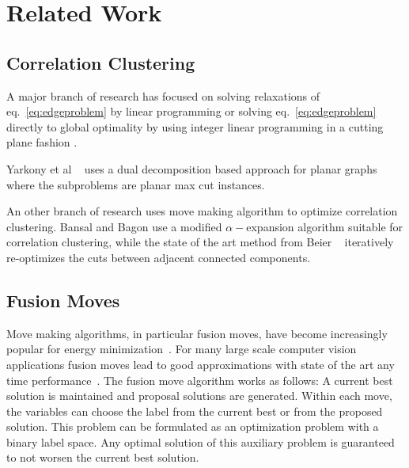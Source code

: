 \documentclass[10pt,twocolumn,letterpaper]{article}
\begin{document}
\section{Related Work}\label{sec:related_work}

\subsection{Correlation Clustering}\label{sec:cc}
A major branch of research has focused on solving 
relaxations of eq.~\ref{eq:edgeproblem} by linear programming
or solving  eq.~\ref{eq:edgeproblem} directly to global optimality
by using integer linear programming in a cutting plane fashion  \cite{kappes_2011_emmcvpr,andres_2011_iccv}.


Yarkony et al ~\cite{yarkony_2012_eccv} uses 
a dual decomposition based approach for planar graphs
where the subproblems are planar max cut instances.

An other branch of research uses move making algorithm 
to optimize correlation clustering.
Bansal and Bagon use a modified $\alpha-$expansion \cite{bansal_2004_ml} 
algorithm suitable for correlation clustering,
while the state of the art method from  Beier \etal~\cite{beier_2014_cvpr} iteratively re-optimizes the cuts
between adjacent connected components.



\subsection{Fusion Moves}\label{sec:fm}
Move making algorithms, in particular fusion moves, 
have become increasingly popular for energy minimization~\cite{???,kappes_2014_ws}.
For many large scale computer vision applications fusion moves lead to good approximations
with state of the art any time performance~\cite{kappes_2014_ws}.
The fusion move algorithm works as follows:
A current best solution is maintained and proposal solutions 
are generated.
Within each move, the variables can choose the label from the current best or from the 
proposed solution. This problem can be formulated as an 
optimization problem with a binary label space.
Any optimal solution of this auxiliary problem is guaranteed
to not worsen the current best solution.
\end{document}
